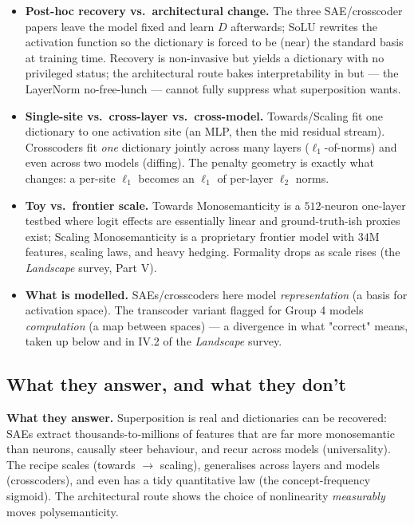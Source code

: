 \begin{itemize}[leftmargin=1.4em]
\item \textbf{Post-hoc recovery vs.\ architectural change.} The three SAE/crosscoder papers leave the model fixed and learn $D$ afterwards; SoLU rewrites the activation function so the dictionary is forced to be (near) the standard basis at training time. Recovery is non-invasive but yields a dictionary with no privileged status; the architectural route bakes interpretability in but --- the LayerNorm no-free-lunch --- cannot fully suppress what superposition wants.
\item \textbf{Single-site vs.\ cross-layer vs.\ cross-model.} Towards/Scaling fit one dictionary to one activation site (an MLP, then the mid residual stream). Crosscoders fit \emph{one} dictionary jointly across many layers ($\ell_1$-of-norms) and even across two models (diffing). The penalty geometry is exactly what changes: a per-site $\ell_1$ becomes an $\ell_1$ of per-layer $\ell_2$ norms.
\item \textbf{Toy vs.\ frontier scale.} Towards Monosemanticity is a $512$-neuron one-layer testbed where logit effects are essentially linear and ground-truth-ish proxies exist; Scaling Monosemanticity is a proprietary frontier model with $34\mathrm{M}$ features, scaling laws, and heavy hedging. Formality drops as scale rises (the \emph{Landscape} survey, Part V).
\item \textbf{What is modelled.} SAEs/crosscoders here model \emph{representation} (a basis for activation space). The transcoder variant flagged for Group 4 models \emph{computation} (a map between spaces) --- a divergence in what "correct" means, taken up below and in IV.2 of the \emph{Landscape} survey.
\end{itemize}

\subsection*{What they answer, and what they don't}

\textbf{What they answer.} Superposition is real and dictionaries can be recovered: SAEs extract thousands-to-millions of features that are far more monosemantic than neurons, causally steer behaviour, and recur across models (universality). The recipe scales (towards $\to$ scaling), generalises across layers and models (crosscoders), and even has a tidy quantitative law (the concept-frequency sigmoid). The architectural route shows the choice of nonlinearity \emph{measurably} moves polysemanticity.

